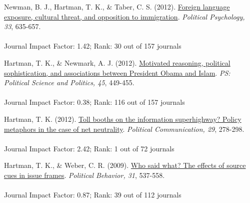 \documentclass[12pt]{article}
\newcommand{\halfblankline}{\quad\vspace{-0.5\baselineskip}\pagebreak[3]}
\begin{document}
\begin{bibenum}
    \item Newman, B. J., {Hartman, T. K.}, \& Taber, C. S. (2012). 
          \href{http://tkhartman.staff.shef.ac.uk/_content/documents/Newman.Hartman.Taber.2012.Political.Psychology.pdf}
          {Foreign language exposure, cultural threat, and opposition to immigration}. 
          \emph{Political Psychology, 33}, 635-657.\\
          \\
          Journal Impact Factor: 1.42; Rank: 30 out of 157 journals

    \item {Hartman, T. K.}, \& Newmark, A. J. (2012). 
          \href{http://tkhartman.staff.shef.ac.uk/_content/documents/Hartman.Newmark.2012.PS.pdf}
          {Motivated reasoning, political sophistication, 
          and associations between President Obama and Islam}. 
          \emph{PS: Political Science and Politics, 45}, 449-455.\\		
          \\
          Journal Impact Factor: 0.38; Rank: 116 out of 157 journals

    \item {Hartman, T. K.} (2012). 
          \href{http://tkhartman.staff.shef.ac.uk/_content/documents//Hartman.2012.Political.Communication.pdf}
          {Toll booths on the information superhighway? 
          Policy metaphors in the case of net neutrality}. 
          \emph{Political Communication, 29}, 278-298.\\
          \\
          Journal Impact Factor: 2.42; Rank: 1 out of 72 journals

    \item {Hartman, T. K.}, \& Weber, C. R. (2009). 
          \href{http://tkhartman.staff.shef.ac.uk/_content/documents//Hartman.Weber.2009.Political.Behavior.pdf}
          {Who said what? The effects of source cues in issue frames}. 
          \emph{Political Behavior, 31}, 537-558.\\		
          \\
          Journal Impact Factor: 0.87; Rank: 39 out of 112 journals
\end{bibenum}

\halfblankline
\end{document}
